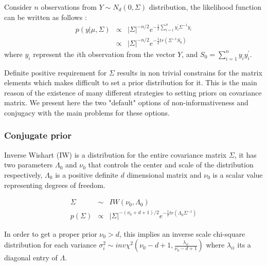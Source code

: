 \documentclass{article}
\begin{document}
 Consider $n$ observations from $Y \sim N_d(0, \Sigma)$ distribution, the likelihood function can be written as follows : 
  \begin{eqnarray}
\nonumber  p(y\vert \mu,\Sigma) &\propto& |\Sigma|^{-n/2} e^{- \frac{1}{2} \sum_{i=1}^n y_i^{'} \Sigma^{-1} y_i  } \\
      &\propto& |\Sigma|^{-n/2} e^{- \frac{1}{2}  tr(\Sigma^{-1}S_0)  } 
 \label{like}
 \end{eqnarray} 
where $y_i$ represent the $i$th  observation from the vector $Y$, and $S_0=\sum_{i=1}^n y_i y_i ^{'}$.  

Definite positive requirement for $\Sigma$ results in non trivial constrains for the matrix elements which makes difficult to set a prior distribution for it. This is the main reason of the existence of many different strategies to setting priors on covariance matrix.  We present here the two "default" options of non-informativeness and conjugacy with the main problems for these options. 

\subsubsection{ Conjugate prior}

Inverse Wishart (IW) is a distribution for the entire covariance matrix $\Sigma$, it has two parameters $\Lambda_0$ and $\nu_0$ that controls the center and scale of the distribution respectively, $\Lambda_0$ is a positive definite $d$ dimensional matrix and $\nu_0$ is a scalar value representing degrees of freedom.
 
\begin{eqnarray}
\nonumber \Sigma &\sim& IW(\nu_0,\Lambda_0) \\
p(\Sigma) &\propto& |\Sigma|^{-(\nu_0 + d +1)/2 } e^{-\frac{1}{2} tr( \Lambda_0 \Sigma^{-1}) }
\label{eq:wis}
\end{eqnarray}

In order to get a proper prior $\nu_0 > d$, this implies an inverse scale chi-square distribution for each variance $\sigma_i^2\sim inv\chi^2(\nu_0 - d + 1, \frac{\lambda_{ii}}{\nu_0-d+1} )$ where $\lambda_{ii}$ its a diagonal entry of $\Lambda$.  
\end{document}
